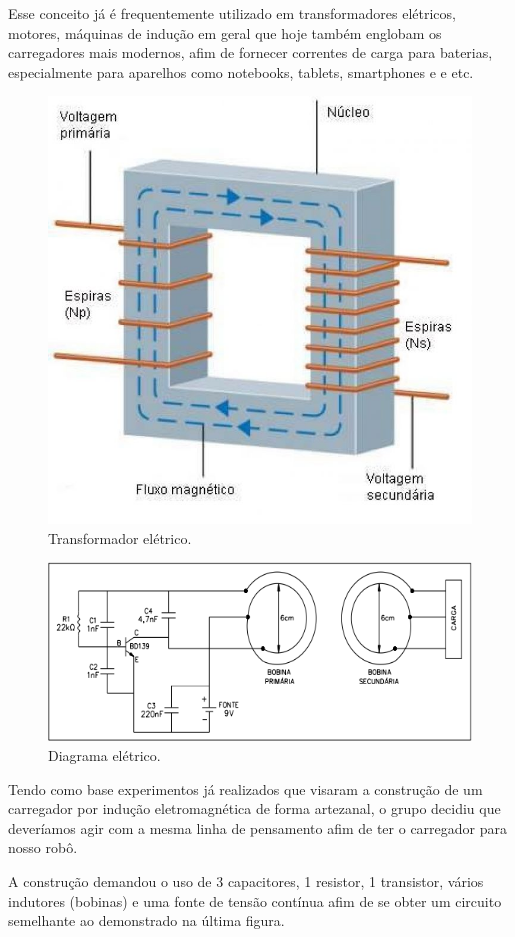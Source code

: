 Esse conceito já é frequentemente utilizado em transformadores elétricos, motores, máquinas de indução em geral que hoje também englobam os carregadores mais modernos, afim de fornecer correntes de carga para baterias, especialmente para aparelhos como notebooks, tablets, smartphones e  e etc.

 \begin{figure}[H]
	\centering
	\includegraphics[scale=0.5]{figuras/transformador}
	\caption{Transformador elétrico.}
	\label{img:transformador}
\end{figure}

 \begin{figure}[H]
	\centering
	\includegraphics[scale=0.5]{figuras/diagrama_eletrico}
	\caption{Diagrama elétrico.}
	\label{img:diagrama_eletrico}
\end{figure}

Tendo como base experimentos já realizados que visaram a construção de um carregador por indução eletromagnética de forma artezanal, o grupo decidiu que deveríamos agir com a mesma linha de pensamento afim de ter o carregador para nosso robô.

A construção demandou o uso de 3 capacitores, 1 resistor, 1 transistor, vários indutores (bobinas) e uma fonte de tensão contínua afim de se obter um circuito semelhante ao demonstrado na última figura.


